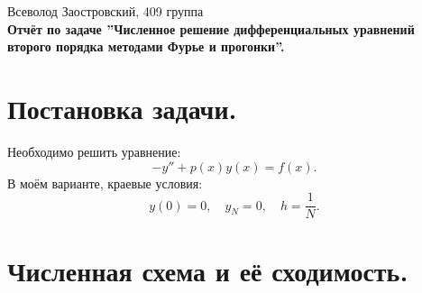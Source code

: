 \documentclass[14pt,a4paper]{extarticle}
\newcommand{\1}{\mathbbm{1}}
\begin{document}
\begin{center}

    {Всеволод Заостровский, 409 группа}\\
    {\bfseries Отчёт по задаче ''Численное решение дифференциальных уравнений второго порядка методами Фурье и прогонки''.\\}
    \vspace{1cm}

\end{center}

\section{Постановка задачи.} Необходимо решить уравнение:
\begin{equation} \label{de1}
    -y'' + p(x) y(x) = f(x).
\end{equation}
В моём варианте, краевые условия:
\begin{equation} \label{diffeqedge}
    y(0) = 0, \quad y_N = 0, \quad h = \frac{1}{N}. 
\end{equation}

\section{Численная схема и её сходимость.}
\end{document}
